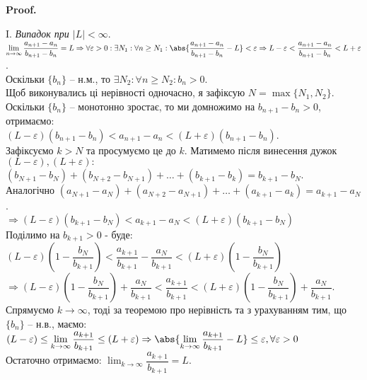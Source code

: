 \documentclass[a4paper, 14pt]{article}
\makeatletter
\def\qed{$\blacksquare$}
\theoremstyle{theoremdd}
\theoremstyle{theoremdd}
\theoremstyle{theoremdd}
\theoremstyle{theoremdd}
\theoremstyle{theoremdd}
\theoremstyle{theoremdd}
\theoremstyle{theoremdd}
\theoremstyle{theoremdd}
\renewenvironment{proof}[1][Proof.\\]{\par
\pushQED{\hfill \qed}%
\normalfont \topsep6\p@\@plus6\p@\relax
\trivlist
\item\relax
{\bfseries
#1\@addpunct{.}}\hspace\labelsep\ignorespaces
}{%
\popQED\endtrivlist\@endpefalse
}
\makeatother
\begin{document}
	\begin{proof}
	I. \textit{Випадок при $|L| < \infty$}.\\
	$\displaystyle \lim_{n \to \infty} \dfrac{a_{n+1} - a_n}{b_{n+1} - b_n} = L \Rightarrow \forall \varepsilon > 0: \exists N_1: \forall n \geq N_1: \abs{\dfrac{a_{n+1}-a_n}{b_{n+1}-b_n} - L} < \varepsilon \Rightarrow L - \varepsilon < \dfrac{a_{n+1} - a_n}{b_{n+1} - b_n} < L + \varepsilon$.\\
	Оскільки $\{b_n\}$ -- н.м., то $\exists N_2: \forall n \geq N_2: b_n > 0$.\\
	Щоб виконувались ці нерівності одночасно, я зафіксую $N = \max \{N_1, N_2\}$.\\
	Оскільки $\{b_n\}$ -- монотонно зростає, то ми домножимо на $b_{n+1} - b_n > 0$, отримаємо:\\
	$(L - \varepsilon)(b_{n+1} - b_n) < a_{n+1} - a_n < (L + \varepsilon)(b_{n+1} - b_n)$.\\
	Зафіксуємо $k > N$ та просумуємо це до $k$. Матимемо після винесення дужок $(L-\varepsilon), (L+\varepsilon):$ \\
	$(b_{N+1} - b_N) + (b_{N+2} - b_{N+1}) + \dots + (b_{k+1} - b_{k}) = b_{k+1} - b_N$.\\
	Аналогічно $(a_{N+1} - a_N) + (a_{N+2} - a_{N+1}) + \dots + (a_{k+1} - a_{k}) = a_{k+1} - a_N$.\\
	$\Rightarrow(L - \varepsilon)(b_{k+1} - b_N) < a_{k+1} - a_N < (L + \varepsilon)(b_{k+1} - b_N)$\\
	Поділимо на $b_{k+1} > 0$ - буде:\\
	$(L - \varepsilon) \left(1 - \dfrac{b_N}{b_{k+1}} \right) < \dfrac{a_{k+1}}{b_{k+1}} - \dfrac{a_N}{b_{k+1}} < (L + \varepsilon) \left(1 - \dfrac{b_N}{b_{k+1}} \right)$\\
	$\Rightarrow (L - \varepsilon) \left(1 - \dfrac{b_N}{b_{k+1}} \right) + \dfrac{a_N}{b_{k+1}}  < \dfrac{a_{k+1}}{b_{k+1}} < (L + \varepsilon) \left(1 - \dfrac{b_N}{b_{k+1}} \right) + \dfrac{a_N}{b_{k+1}}$.\\
	Спрямуємо $k \to \infty$, тоді за теоремою про нерівність та з урахуванням тим, що $\{b_n\}$ -- н.в., маємо:\\
	$(L-\varepsilon) \leq \displaystyle \lim_{k \to \infty} \dfrac{a_{k+1}}{b_{k+1}} \leq (L + \varepsilon) \Rightarrow \abs{\displaystyle \lim_{k \to \infty} \dfrac{a_{k+1}}{b_{k+1}} - L} \leq \varepsilon, \forall \varepsilon > 0$\\
	Остаточно отримаємо: $\displaystyle \lim_{k \to \infty} \dfrac{a_{k+1}}{b_{k+1}} = L$.
	\bigskip \\

\end{proof}
\end{document}
